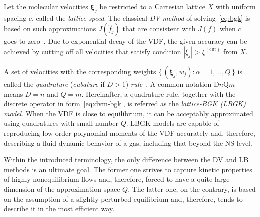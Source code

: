 \documentclass[]{elsarticle} %
\newcommand{\Set}[2]{\{\,{#1}:{#2}\,\}}
\DeclarePairedDelimiter\autobracket()       %
\newcommand{\br}[1]{\autobracket*{#1}}
\newcommand{\bxi}{\boldsymbol{\xi}}
\newcommand{\xiai}{\xi_{j \alpha}}
\newcommand{\xiaj}{\xi_{j \beta}}
\newcommand{\equil}[1]{#1^\mathrm{(eq)}}
\begin{document}
{%
Let the molecular velocities \(\bxi_j \) be restricted to a Cartesian lattice \(X\)
with uniform spacing \(c\), called the \emph{lattice speed}.
The classical \emph{DV method} of solving~\eqref{eq:bgk} is based on such approximations \(J(\hat{f}_j)\)
that are consistent with \(J(f)\) when \(c\) goes to zero~\cite{Aristov2001}.
Due to exponential decay of the VDF, the given accuracy can be achieved
by cutting off all velocities that satisfy condition \(|\xi_j| > \xi^{(\mathrm{cut})}\) from \(X\).

A set of velocities with the corresponding weights \(\Set{(\bxi_j,w_j)}{\alpha=1,\dots,Q}\)
is called the \emph{quadrature} (\emph{cubature} if \(D>1\)) \emph{rule}~\cite{Stroud1971}.
A common notation D\(n\)Q\(m\) means \(D=n\) and \(Q=m\).
Hereinafter, a quadrature rule, together with the discrete operator in form~\eqref{eq:dvm-bgk},
is referred as the \emph{lattice-BGK (LBGK) model}.
When the VDF is close to equilibrium, it can be acceptably approximated using quadratures with small number \(Q\).
LBGK models are capable of reproducing low-order polynomial moments of the VDF accurately and,
therefore, describing a fluid-dynamic behavior of a gas, including that beyond the NS level.

Within the introduced terminology, the only difference between the DV and LB methods is an ultimate goal.
The former one strives to capture kinetic properties of highly nonequilibrium flows and, therefore,
forced to have a quite large dimension of the approximation space \(Q\).
The latter one, on the contrary, is based on the assumption of a slightly perturbed equilibrium and, therefore,
tends to describe it in the most efficient way.


}
\end{document}

